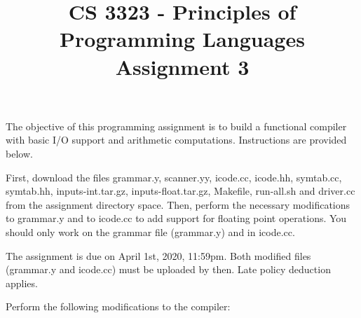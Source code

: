 \documentclass[letter,10pt]{article}
\title{CS 3323 - Principles of Programming Languages\\ Assignment 3}
\date{}
\begin{document}
\maketitle

The objective of this programming assignment is to build a functional compiler with basic I/O support and arithmetic computations. Instructions are provided below.

First, download the files 
grammar.y, scanner.yy, icode.cc, icode.hh, symtab.cc, symtab.hh, inputs-int.tar.gz, inputs-float.tar.gz, Makefile, run-all.sh and driver.cc from the assignment directory space. 
Then, perform the necessary modifications
to grammar.y and to icode.cc to add support for floating point operations. You should only work on the grammar file (grammar.y)
and in icode.cc.

The assignment is due on April 1st, 2020, 11:59pm. Both modified files (grammar.y and icode.cc) must be uploaded by then. Late policy deduction applies.

Perform the following modifications to the compiler:
\end{document}
